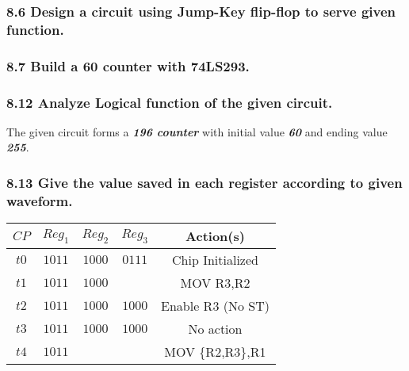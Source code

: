     \subsubsection{8.6 \textnormal{Design a circuit using Jump-Key flip-flop to serve given function}.}
    {\color{hwSolution}

        

    }

    \subsubsection{8.7 \textnormal{Build a 60 counter with 74LS293}.}
    {\color{hwSolution}

        

    }

    \subsubsection{8.12 \textnormal{Analyze Logical function of the given circuit}.}
    {\color{hwSolution}

        The given circuit forms a \textbf{\textit{196 counter}} with initial value \textbf{\textit{60}} and ending value \textbf{\textit{255}}.

    }

    \subsubsection{8.13 \textnormal{Give the value saved in each register according to given waveform}.}
    {\color{hwSolution}

    \begin{center}\begin{tabular}{|c|c|c|c|c|}
        \hline
        $ CP $ & $Reg_1$ & $Reg_2$ & $Reg_3$ & Action(s)
        \\
        \hline
        $ t0 $ & $1011$ & $1000$ & $0111$ & Chip Initialized \\
        $ t1 $ & $1011$ & $1000$ & \color{red}{$1000$} & MOV R3,R2 \\
        $ t2 $ & $1011$ & $1000$ & $1000$ & Enable R3 (No ST) \\
        $ t3 $ & $1011$ & $1000$ & $1000$ & No action \\
        $ t4 $ & $1011$ & \color{red}{$1011$} & \color{red}{$1011$} & MOV \{R2,R3\},R1 \\
        \hline
    \end{tabular}\end{center}

    }

